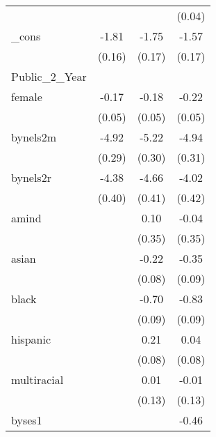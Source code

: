 {\begin{tabular}{l*{3}{c}}
            &                     &                     &      (0.04)         \\
[1em]
\_cons      &       -1.81\sym{***}&       -1.75\sym{***}&       -1.57\sym{***}\\
            &      (0.16)         &      (0.17)         &      (0.17)         \\
\hline
Public\_2\_Year&                     &                     &                     \\
female      &       -0.17\sym{***}&       -0.18\sym{***}&       -0.22\sym{***}\\
            &      (0.05)         &      (0.05)         &      (0.05)         \\
[1em]
bynels2m    &       -4.92\sym{***}&       -5.22\sym{***}&       -4.94\sym{***}\\
            &      (0.29)         &      (0.30)         &      (0.31)         \\
[1em]
bynels2r    &       -4.38\sym{***}&       -4.66\sym{***}&       -4.02\sym{***}\\
            &      (0.40)         &      (0.41)         &      (0.42)         \\
[1em]
amind       &                     &        0.10         &       -0.04         \\
            &                     &      (0.35)         &      (0.35)         \\
[1em]
asian       &                     &       -0.22\sym{**} &       -0.35\sym{***}\\
            &                     &      (0.08)         &      (0.09)         \\
[1em]
black       &                     &       -0.70\sym{***}&       -0.83\sym{***}\\
            &                     &      (0.09)         &      (0.09)         \\
[1em]
hispanic    &                     &        0.21\sym{*}  &        0.04         \\
            &                     &      (0.08)         &      (0.08)         \\
[1em]
multiracial &                     &        0.01         &       -0.01         \\
            &                     &      (0.13)         &      (0.13)         \\
[1em]
byses1      &                     &                     &       -0.46\sym{***}\\

\end{tabular}}
